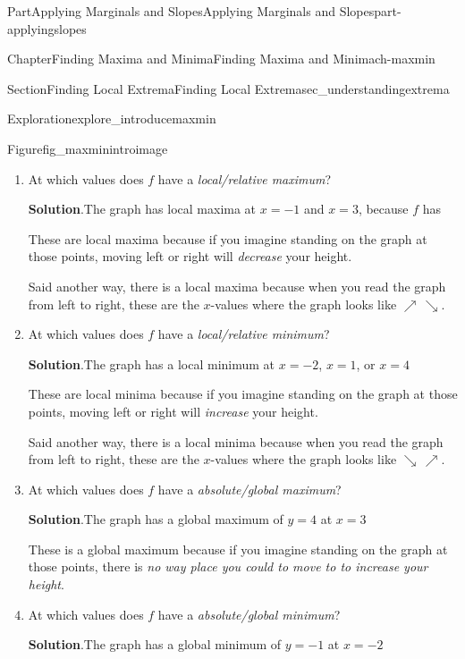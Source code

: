 \documentclass[oneside,10pt,]{tufte-book}
\newcommand{\blocktitlefont}{\relax}
\numberwithin{equation}{chapter}
\begin{document}
\begin{partptx}{Part}{Applying Marginals and Slopes}{}{Applying Marginals and Slopes}{}{}{part-applyingslopes}
\begin{chapterptx}{Chapter}{Finding Maxima and Minima}{}{Finding Maxima and Minima}{}{}{ch-maxmin}
\begin{sectionptx}{Section}{Finding Local Extrema}{}{Finding Local Extrema}{}{}{sec_understandingextrema}
\begin{exploration}{Exploration}{}{explore_introducemaxmin}
\begin{figureptx}{Figure}{}{fig_maxminintroimage}{}
\begin{image}{0.125}{0.75}{0.125}{}
{\begin{tikzpicture}
\end{tikzpicture}
}%
\end{image}%
\tcblower
\end{figureptx}%
\begin{enumerate}[font=\bfseries,label=(\alph*),ref=\alph*]%
\item{}At which values does \(f\) have a \emph{local\slash{}relative maximum}?%
\par\smallskip%
\noindent\textbf{\blocktitlefont Solution}.\hypertarget{explore_introducemaxmin-2-2}{}\quad{}The graph has local maxima at \(x=-1\) and \(x=3\), because \(f\) has \emph{}%
\par
These are local maxima because if you imagine standing on the graph at those points, moving left or right will \emph{decrease} your height.%
\par
Said another way, there is a local maxima because when you read the graph from left to right, these are the \(x\)-values where the graph looks like \(\nearrow\, \searrow\).%
\item{}At which values does \(f\) have a \emph{local\slash{}relative minimum}?%
\par\smallskip%
\noindent\textbf{\blocktitlefont Solution}.\hypertarget{explore_introducemaxmin-3-2}{}\quad{}The graph has a local minimum at \(x=-2\), \(x=1\), or \(x=4\)%
\par
These are local minima because if you imagine standing on the graph at those points, moving left or right will \emph{increase} your height.%
\par
Said another way, there is a local minima because when you read the graph from left to right, these are the \(x\)-values where the graph looks like \(\searrow\, \nearrow\).%
\item{}At which values does \(f\) have a \emph{absolute\slash{}global maximum}?%
\par\smallskip%
\noindent\textbf{\blocktitlefont Solution}.\hypertarget{explore_introducemaxmin-4-2}{}\quad{}The graph has a global maximum of \(y=4\) at \(x=3\)%
\par
These is a global maximum because if you imagine standing on the graph at those points, there is \emph{no way place you could to move to to increase your height}.%
\item{}At which values does \(f\) have a \emph{absolute\slash{}global minimum}?%
\par\smallskip%
\noindent\textbf{\blocktitlefont Solution}.\hypertarget{explore_introducemaxmin-5-2}{}\quad{}The graph has a global minimum of \(y=-1\) at \(x=-2\)%

\end{enumerate}
\end{exploration}
\end{sectionptx}
\end{chapterptx}
\end{partptx}
\end{document}
